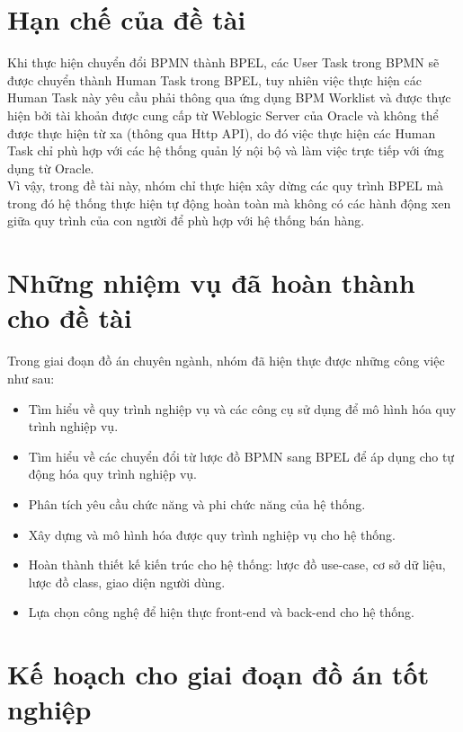 \section{Hạn chế của đề tài}
\hspace{0.5cm} Khi thực hiện chuyển đổi BPMN thành BPEL, các User Task trong BPMN sẽ được chuyển thành Human Task trong BPEL, tuy nhiên việc thực hiện các Human Task này yêu cầu phải thông qua ứng dụng BPM Worklist và được thực hiện bởi tài khoản được cung cấp từ Weblogic Server của Oracle và không thể được thực hiện từ xa (thông qua Http API), do đó việc thực hiện các Human Task chỉ phù hợp với các hệ thống quản lý nội bộ và làm việc trực tiếp với ứng dụng từ Oracle. \\

Vì vậy, trong đề tài này, nhóm chỉ thực hiện xây dừng các quy trình BPEL mà trong đó hệ thống thực hiện tự động hoàn toàn mà không có các hành động xen giữa quy trình của con người để phù hợp với hệ thống bán hàng.


\section{Những nhiệm vụ đã hoàn thành cho đề tài}
Trong giai đoạn đồ án chuyên ngành, nhóm đã hiện thực được những công việc như sau:
\begin{itemize}
    \item Tìm hiểu về quy trình nghiệp vụ và các công cụ sử dụng để mô hình hóa quy trình nghiệp vụ.
    \item Tìm hiểu về các chuyển đổi từ lược đồ BPMN sang BPEL để áp dụng cho tự động hóa quy trình nghiệp vụ.
    \item Phân tích yêu cầu chức năng và phi chức năng của hệ thống.
    \item Xây dựng và mô hình hóa được quy trình nghiệp vụ cho hệ thống.
    \item Hoàn thành thiết kế kiến trúc cho hệ thống: lược đồ use-case, cơ sở dữ liệu, lược đồ class, giao diện người dùng.
    \item  Lựa chọn công nghệ để hiện thực front-end và back-end cho hệ thống.
\end{itemize}
 
 
\section{Kế hoạch cho giai đoạn đồ án tốt nghiệp}
 
